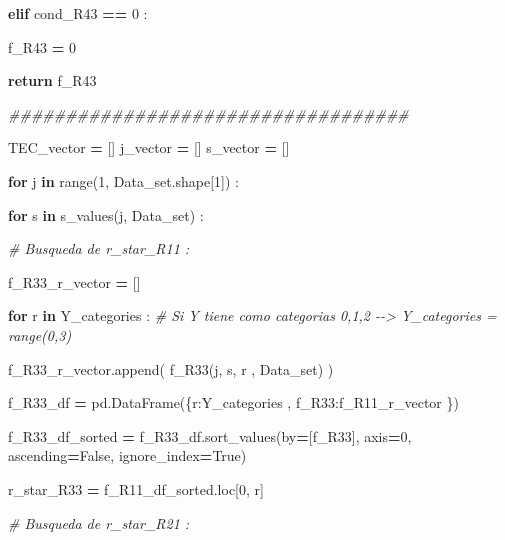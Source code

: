 \documentclass[
  11pt,
  a4paper,
]{article}
\newenvironment{Shaded}{\begin{snugshade}}{\end{snugshade}}
\newcommand{\BuiltInTok}[1]{#1}
\newcommand{\CommentTok}[1]{\textcolor[rgb]{0.56,0.35,0.01}{\textit{#1}}}
\newcommand{\ControlFlowTok}[1]{\textcolor[rgb]{0.13,0.29,0.53}{\textbf{#1}}}
\newcommand{\DecValTok}[1]{\textcolor[rgb]{0.00,0.00,0.81}{#1}}
\newcommand{\KeywordTok}[1]{\textcolor[rgb]{0.13,0.29,0.53}{\textbf{#1}}}
\newcommand{\NormalTok}[1]{#1}
\newcommand{\OperatorTok}[1]{\textcolor[rgb]{0.81,0.36,0.00}{\textbf{#1}}}
\newcommand{\StringTok}[1]{\textcolor[rgb]{0.31,0.60,0.02}{#1}}
\newcommand{\VariableTok}[1]{\textcolor[rgb]{0.00,0.00,0.00}{#1}}
\begin{document}
\begin{Shaded}
\begin{Highlighting}[]
            
            \ControlFlowTok{elif}\NormalTok{ cond\_R43 }\OperatorTok{==} \DecValTok{0}\NormalTok{ :}

\NormalTok{                f\_R43 }\OperatorTok{=} \DecValTok{0}

            
            \ControlFlowTok{return}\NormalTok{ f\_R43 }

        
        \CommentTok{\#\#\#\#\#\#\#\#\#\#\#\#\#\#\#\#\#\#\#\#\#\#\#\#\#\#\#\#\#\#\#\#\#\#\#}

\NormalTok{        TEC\_vector }\OperatorTok{=}\NormalTok{ []}
\NormalTok{        j\_vector }\OperatorTok{=}\NormalTok{ []}
\NormalTok{        s\_vector }\OperatorTok{=}\NormalTok{ []}


        \ControlFlowTok{for}\NormalTok{ j }\KeywordTok{in} \BuiltInTok{range}\NormalTok{(}\DecValTok{1}\NormalTok{, Data\_set.shape[}\DecValTok{1}\NormalTok{]) :}

            \ControlFlowTok{for}\NormalTok{ s }\KeywordTok{in}\NormalTok{ s\_values(j, Data\_set) :}

                \CommentTok{\# Busqueda de r\_star\_R11 :}

\NormalTok{                f\_R33\_r\_vector }\OperatorTok{=}\NormalTok{ []}

                \ControlFlowTok{for}\NormalTok{ r }\KeywordTok{in}\NormalTok{ Y\_categories :  }\CommentTok{\# Si Y tiene como categorias 0,1,2 {-}{-}\textgreater{} Y\_categories = range(0,3)}

\NormalTok{                    f\_R33\_r\_vector.append( f\_R33(j, s, r , Data\_set) )}

\NormalTok{                f\_R33\_df }\OperatorTok{=}\NormalTok{ pd.DataFrame(\{}\StringTok{\textquotesingle{}r\textquotesingle{}}\NormalTok{:Y\_categories  , }\StringTok{\textquotesingle{}f\_R33\textquotesingle{}}\NormalTok{:f\_R11\_r\_vector \})}
        
\NormalTok{                f\_R33\_df\_sorted }\OperatorTok{=}\NormalTok{ f\_R33\_df.sort\_values(by}\OperatorTok{=}\NormalTok{[}\StringTok{\textquotesingle{}f\_R33\textquotesingle{}}\NormalTok{], axis}\OperatorTok{=}\DecValTok{0}\NormalTok{, ascending}\OperatorTok{=}\VariableTok{False}\NormalTok{, ignore\_index}\OperatorTok{=}\VariableTok{True}\NormalTok{)}

\NormalTok{                r\_star\_R33 }\OperatorTok{=}\NormalTok{ f\_R11\_df\_sorted.loc[}\DecValTok{0}\NormalTok{, }\StringTok{\textquotesingle{}r\textquotesingle{}}\NormalTok{]}


                \CommentTok{\# Busqueda de r\_star\_R21 :}


\end{Highlighting}
\end{Shaded}
\end{document}
